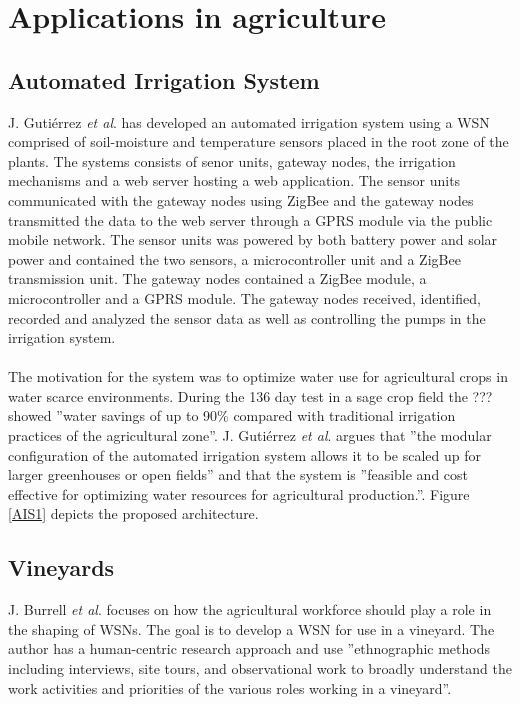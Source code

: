 \documentclass[]{uiophd}
\begin{document}
\section{Applications in agriculture}
\subsection{Automated Irrigation System}
J. Gutiérrez \textit{et al}. \cite{6582678} has developed an automated irrigation system using a WSN comprised of soil-moisture and temperature sensors placed in the root zone of the plants. The systems consists of senor units, gateway nodes, the irrigation mechanisms and a web server hosting a web application. The sensor units communicated with the gateway nodes using ZigBee and the gateway nodes transmitted the data to the web server through a GPRS module via the public mobile network. The sensor units was powered by both battery power and solar power and contained the two sensors, a microcontroller unit and a ZigBee transmission unit. The gateway nodes contained a ZigBee module, a microcontroller and a GPRS module. The gateway nodes received, identified, recorded and analyzed the sensor data as well as controlling the pumps in the irrigation system.
\\\\
The motivation for the system was to optimize water use for agricultural crops in water scarce environments. During the 136 day test in a sage crop field the ??? showed ''water savings of up to 90\% compared with traditional irrigation practices of the agricultural zone''\cite{6582678174}. J. Gutiérrez \textit{et al}. argues that ''the modular configuration of the automated irrigation system allows it to be scaled up for larger greenhouses or open fields''\cite{6582678166} and that the system is ''feasible and cost effective for optimizing water resources for agricultural production.''\cite{6582678174}. Figure \ref{AIS1} depicts the proposed architecture.

\subsection{Vineyards}
J. Burrell \textit{et al}.\cite{1269130} focuses on how the agricultural workforce should play a role in the shaping of WSNs. The goal is to develop a WSN for use in a vineyard. The author has a human-centric research approach and use ''ethnographic methods including interviews, site tours, and observational work to broadly understand the work activities and priorities of the various roles working in a vineyard''\cite{126913038}.
\end{document}

